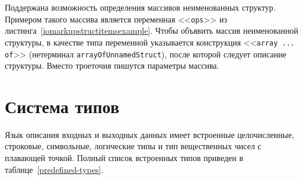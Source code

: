 \documentclass[times,specification,annotation]{style/itmo-student-thesis/itmo-student-thesis}
\begin{document}
Поддержана возможность определения массивов неименованных структур. Примером такого массива является переменная <<\texttt{ops}>> из листинга~\ref{iomarkupstructitemsexample}. Чтобы объявить массив неименованной структуры, в качестве типа переменной указывается конструкция <<\texttt{array ... of}>> (нетерминал \texttt{arrayOfUnnamedStruct}), после которой следует описание структуры. Вместо троеточия пишутся параметры массива.






\section{Система типов}\label{type-system}

Язык описания входных и выходных данных имеет встроенные целочисленные, строковые, символьные, логические типы и тип вещественных чисел с плавающей точкой. Полный список встроенных типов приведен в таблице~\ref{predefined-types}.
\end{document}
